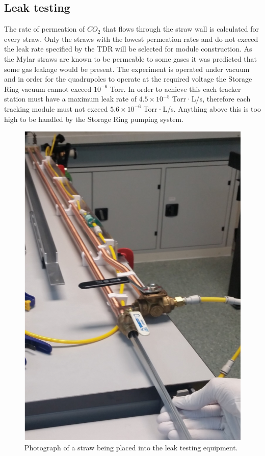 \subsection {Leak testing}

The rate of permeation of $CO_{2}$ that flows through the straw wall is calculated for every straw. Only the straws with the lowest permeation rates and do not exceed the leak rate specified by the TDR will be selected for module construction. As the Mylar straws are known to be permeable to some gases it was predicted that some gas leakage would be present. The experiment is operated under vacuum and in order for the quadrupoles to operate at the required voltage the Storage Ring vacuum cannot exceed $10^{-6}$ Torr. In order to achieve this each tracker station must have a maximum leak rate of $4.5\times10^{-5}$ Torr·L/s, therefore each tracking module must not exceed $5.6\times10^{-6}$ Torr·L/s. Anything above this is too high to be handled by the Storage Ring pumping system.

\begin{figure}[ht]
\centering
\includegraphics[scale=0.8]{Figures/leaktestsetup}
\decoRule
\caption{Photograph of a straw being placed into the leak testing equipment.}
\label{fig:leaktestsetup}
\end{figure}

